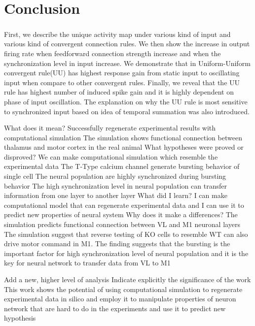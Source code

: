 \chapter{Conclusion}

\paragraph{} First, we describe the unique activity map under various kind of input and various kind of convergent connection rules.  We then show the increase in output firing rate when feedforward connection strength increase and when the synchronization level in input increase. 
We demonstrate that in Uniform-Uniform convergent rule(UU) has highest response gain from static input to oscillating input when compare to other convergent rules.  
Finally, we reveal that the UU rule has highest number of induced spike gain and it is highly dependent on phase of input oscillation. The explanation on why the UU rule is most sensitive to synchronized input based on idea of temporal summation was also introduced. 

What does it mean?
Successfully regenerate experimental results with computational simulation
The simulation shows functional connection between thalamus and motor cortex in the real animal
What hypotheses were proved or disproved?
We can make computational simulation which resemble the experimental data
The T-Type calcium channel generate bursting behavior of single cell
The neural population are highly synchronized during bursting behavior
The high synchronization level in neural population can transfer information from one layer to another layer
What did I learn?
I can make computational model that can regenerate experimental data and I can use it to predict new properties of neural system
Why does it make a differences?
The simulation predicts functional connection between VL and M1 neuronal layers
The simulation suggest that reverse testing of KO cells to resemble WT can also drive motor command in M1. The finding suggests that the bursting is the important factor for high synchronization level of neural population and it is the key for neural network to transfer data from VL to M1

Add a new, higher level of analysis
Indicate explicitly the significance of the work
This work shows the potential of using computational simulation to regenerate experimental data in silico and employ it to manipulate properties of neuron network that are hard to do in the experiments and use it to predict new hypothesis
